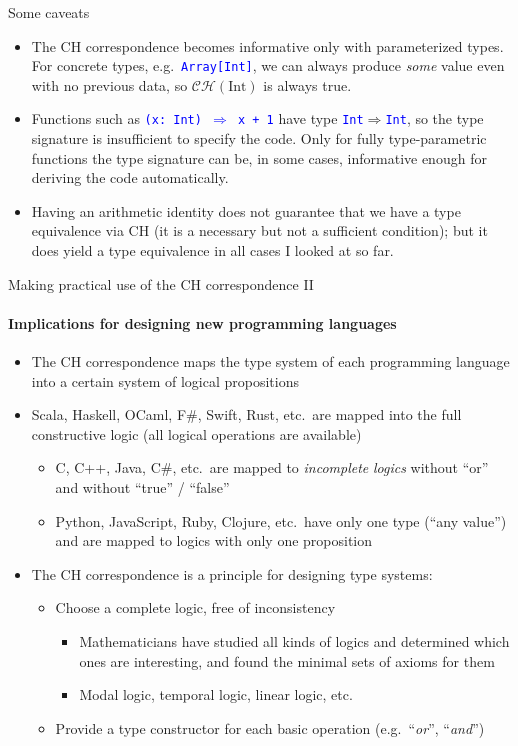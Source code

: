 \documentclass[english]{beamer}
\begin{document}
\begin{frame}{Some caveats}

\begin{itemize}
\item The CH correspondence becomes informative only with parameterized
types. For concrete types, e.g.\ \texttt{\textcolor{blue}{\footnotesize{}Array{[}Int{]}}},
we can always produce \emph{some} value even with no previous data,
so $\mathcal{CH}(\text{Int})$ is always true.
\item Functions such as \texttt{\textcolor{blue}{\footnotesize{}(x:\ Int)
$\Rightarrow$ x + 1}} have type \texttt{\textcolor{blue}{\footnotesize{}Int}}$\Rightarrow$\texttt{\textcolor{blue}{\footnotesize{}Int}},
so the type signature is insufficient to specify the code. Only for
fully type-parametric functions the type signature can be, in some
cases, informative enough for deriving the code automatically.
\item Having an arithmetic identity does not guarantee that we have a type
equivalence via CH (it is a necessary but not a sufficient condition);
but it does yield a type equivalence in all cases I looked at so far.
\end{itemize}
\end{frame}

\begin{frame}{Making practical use of the CH correspondence II}


\framesubtitle{Implications for designing new programming languages}
\begin{itemize}
\item The CH correspondence maps the type system of each programming language
into a certain system of logical propositions 
\item Scala, Haskell, OCaml, F\#, Swift, Rust, etc.~are mapped into the
full constructive logic (all logical operations are available)
\begin{itemize}
\item C, C++, Java, C\#, etc.~are mapped to \emph{incomplete} \emph{logics}
\textendash{} without ``or'' and without ``true'' / ``false''
\item Python, JavaScript, Ruby, Clojure, etc.~have only one type (``any
value'') and are mapped to logics with only one proposition
\end{itemize}
\item The CH correspondence is a principle for designing type systems:
\begin{itemize}
\item Choose a complete logic, free of inconsistency
\begin{itemize}
\item Mathematicians have studied all kinds of logics and determined which
ones are interesting, and found the minimal sets of axioms for them
\item Modal logic, temporal logic, linear logic, etc.
\end{itemize}
\item Provide a type constructor for each basic operation (e.g.~``\emph{or}'',
``\emph{and}'')
\end{itemize}
\end{itemize}
\end{frame}
\end{document}
